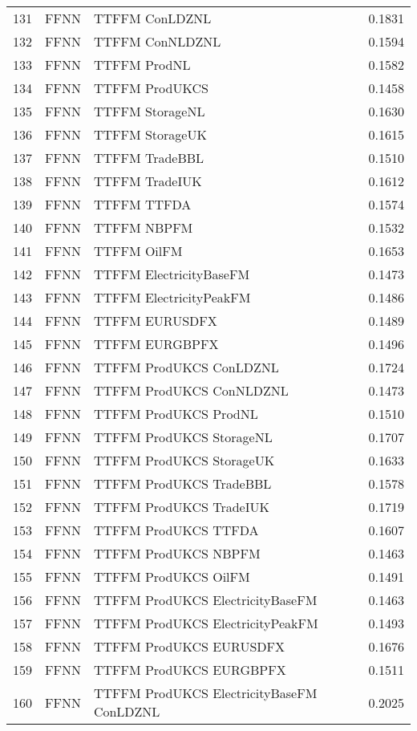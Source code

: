 \begin{table}[ht]
\begin{tabular}{rllr}
  131 & FFNN & TTFFM ConLDZNL & 0.1831 \\ 
  132 & FFNN & TTFFM ConNLDZNL & 0.1594 \\ 
  133 & FFNN & TTFFM ProdNL & 0.1582 \\ 
  134 & FFNN & TTFFM ProdUKCS & 0.1458 \\ 
  135 & FFNN & TTFFM StorageNL & 0.1630 \\ 
  136 & FFNN & TTFFM StorageUK & 0.1615 \\ 
  137 & FFNN & TTFFM TradeBBL & 0.1510 \\ 
  138 & FFNN & TTFFM TradeIUK & 0.1612 \\ 
  139 & FFNN & TTFFM TTFDA & 0.1574 \\ 
  140 & FFNN & TTFFM NBPFM & 0.1532 \\ 
  141 & FFNN & TTFFM OilFM & 0.1653 \\ 
  142 & FFNN & TTFFM ElectricityBaseFM & 0.1473 \\ 
  143 & FFNN & TTFFM ElectricityPeakFM & 0.1486 \\ 
  144 & FFNN & TTFFM EURUSDFX & 0.1489 \\ 
  145 & FFNN & TTFFM EURGBPFX & 0.1496 \\ 
  146 & FFNN & TTFFM ProdUKCS ConLDZNL & 0.1724 \\ 
  147 & FFNN & TTFFM ProdUKCS ConNLDZNL & 0.1473 \\ 
  148 & FFNN & TTFFM ProdUKCS ProdNL & 0.1510 \\ 
  149 & FFNN & TTFFM ProdUKCS StorageNL & 0.1707 \\ 
  150 & FFNN & TTFFM ProdUKCS StorageUK & 0.1633 \\ 
  151 & FFNN & TTFFM ProdUKCS TradeBBL & 0.1578 \\ 
  152 & FFNN & TTFFM ProdUKCS TradeIUK & 0.1719 \\ 
  153 & FFNN & TTFFM ProdUKCS TTFDA & 0.1607 \\ 
  154 & FFNN & TTFFM ProdUKCS NBPFM & 0.1463 \\ 
  155 & FFNN & TTFFM ProdUKCS OilFM & 0.1491 \\ 
  156 & FFNN & TTFFM ProdUKCS ElectricityBaseFM & 0.1463 \\ 
  157 & FFNN & TTFFM ProdUKCS ElectricityPeakFM & 0.1493 \\ 
  158 & FFNN & TTFFM ProdUKCS EURUSDFX & 0.1676 \\ 
  159 & FFNN & TTFFM ProdUKCS EURGBPFX & 0.1511 \\ 
  160 & FFNN & TTFFM ProdUKCS ElectricityBaseFM ConLDZNL & 0.2025 \\ 

\end{tabular}
\end{table}

